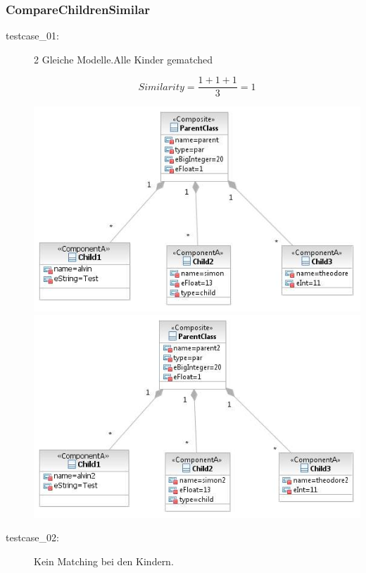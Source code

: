 \documentclass[a4paper]{article}
\begin{document}
\subsubsection{CompareChildrenSimilar}

  \begin{description}
  
  \item[testcase\_01:] 2 Gleiche Modelle.Alle Kinder gematched
    
   \begin{equation*}
   Similarity = \frac{1+1+1}{3}=1
   \end{equation*}

  
    
	\includegraphics[scale=0.5]{CompareChildrenMatchedOrSimilarTestScreens/Testcase01model1.jpeg}
	\includegraphics[scale=0.5]{CompareChildrenMatchedOrSimilarTestScreens/Testcase01model2.jpeg}

  \item[testcase\_02:]  Kein Matching bei den Kindern.
    

\end{description}
\end{document}
